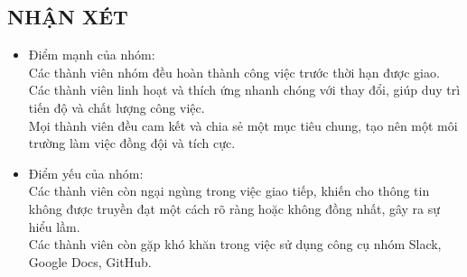 \documentclass[article]{llncs}
\begin{document}
\subsection{NHẬN XÉT}
\begin{itemize}
    \item Điểm mạnh của nhóm:\\
    Các thành viên nhóm đều hoàn thành công việc trước thời hạn được giao.\\
Các thành viên linh hoạt và thích ứng nhanh chóng với thay đổi, giúp duy trì tiến độ và chất lượng công việc.\\
Mọi thành viên đều cam kết và chia sẻ một mục tiêu chung, tạo nên một môi trường làm việc đồng đội và tích cực.
\end{itemize}
\begin{itemize}
    \item Điểm yếu của nhóm:\\
    Các thành viên còn ngại ngùng trong việc giao tiếp, khiến cho thông tin không được truyền đạt một cách rõ ràng hoặc không đồng nhất, gây ra sự hiểu lầm.\\
Các thành viên còn gặp khó khăn trong việc sử dụng công cụ nhóm Slack, Google Docs, GitHub.
\end{itemize}
\end{document}
